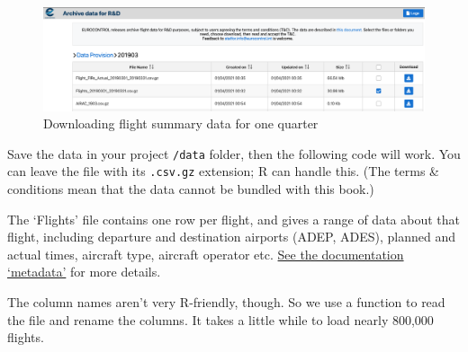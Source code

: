 \documentclass[
]{book}
\begin{document}
\begin{figure}
\centering
\includegraphics{images/RDArchive_download.png}
\caption{Downloading flight summary data for one quarter}
\end{figure}

Save the data in your project \texttt{/data} folder, then the following code will work. You can leave the file with its \texttt{.csv.gz} extension; R can handle this. (The terms \& conditions mean that the data cannot be bundled with this book.)

The `Flights' file contains one row per flight, and gives a range of data about that flight, including departure and destination airports (ADEP, ADES), planned and actual times, aircraft type, aircraft operator etc. \href{https://www.eurocontrol.int/publication/rnd-data-archive-structure-and-sample}{See the documentation `metadata'} for more details.

The column names aren't very R-friendly, though. So we use a function to read the file and rename the columns. It takes a little while to load nearly 800,000 flights.
\end{document}
